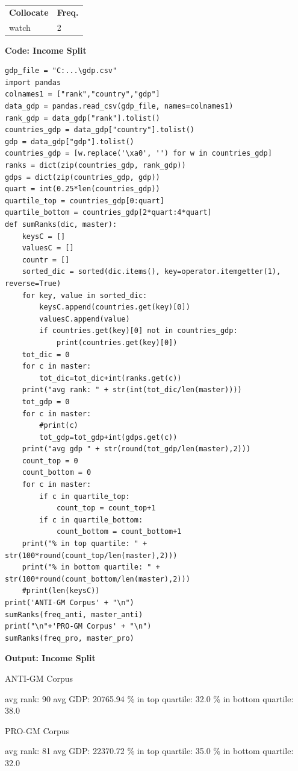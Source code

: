 \begin{table}[H]
\begin{footnotesize}
\begin{tabular}{ll}
\textbf{Collocate} & \textbf{Freq.} \\
watch      & 2             
\end{tabular}
\end{footnotesize}
\end{table}


\textbf{Code: Income Split}

\begin{lstlisting}
gdp_file = "C:...\gdp.csv"
import pandas
colnames1 = ["rank","country","gdp"]
data_gdp = pandas.read_csv(gdp_file, names=colnames1)
rank_gdp = data_gdp["rank"].tolist()
countries_gdp = data_gdp["country"].tolist()
gdp = data_gdp["gdp"].tolist()
countries_gdp = [w.replace('\xa0', '') for w in countries_gdp]
ranks = dict(zip(countries_gdp, rank_gdp))
gdps = dict(zip(countries_gdp, gdp))
quart = int(0.25*len(countries_gdp))
quartile_top = countries_gdp[0:quart]
quartile_bottom = countries_gdp[2*quart:4*quart]
def sumRanks(dic, master):
    keysC = []
    valuesC = []
    countr = []
    sorted_dic = sorted(dic.items(), key=operator.itemgetter(1), reverse=True)
    for key, value in sorted_dic:
        keysC.append(countries.get(key)[0])
        valuesC.append(value)
        if countries.get(key)[0] not in countries_gdp:
            print(countries.get(key)[0])
    tot_dic = 0
    for c in master:
        tot_dic=tot_dic+int(ranks.get(c))
    print("avg rank: " + str(int(tot_dic/len(master))))
    tot_gdp = 0
    for c in master:
        #print(c)
        tot_gdp=tot_gdp+int(gdps.get(c))
    print("avg gdp " + str(round(tot_gdp/len(master),2)))
    count_top = 0
    count_bottom = 0
    for c in master:
        if c in quartile_top:
            count_top = count_top+1
        if c in quartile_bottom:
            count_bottom = count_bottom+1 
    print("% in top quartile: " + str(100*round(count_top/len(master),2)))
    print("% in bottom quartile: " + str(100*round(count_bottom/len(master),2)))
    #print(len(keysC))
print('ANTI-GM Corpus' + "\n")  
sumRanks(freq_anti, master_anti)
print("\n"+'PRO-GM Corpus' + "\n")  
sumRanks(freq_pro, master_pro)

\end{lstlisting}


\textbf{Output: Income Split}

\begin{footnotesize}
ANTI-GM Corpus

avg rank: 90\newline
avg GDP: 20765.94\newline
\% in top quartile: 32.0\newline
\% in bottom quartile: 38.0

PRO-GM Corpus

avg rank: 81\newline
avg GDP: 22370.72\newline
\% in top quartile: 35.0\newline
\% in bottom quartile: 32.0
\end{footnotesize}